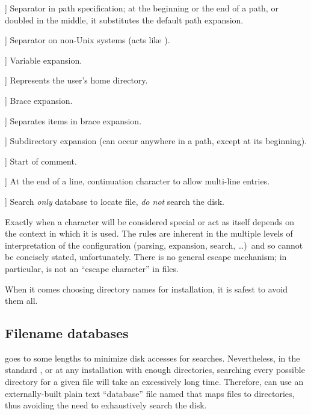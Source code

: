 \documentclass[12pt]{article}
\begin{document}
\newcommand{\CODE}[1]{\makebox[3em][l]{\code{#1}}}
\begin{ttdescription}
\item[\CODE{:}] Separator in path specification; at the beginning or
  the end of a path, or doubled in the middle, it substitutes the
  default path expansion.\par
\item[\CODE{;}] Separator on non-Unix systems (acts like \code{:}).
\item[\CODE{\$}] Variable expansion.
\item[\CODE{\string~}] Represents the user's home directory.
\item[\CODE{\char`\{...\char`\}}] Brace expansion.
\item[\CODE{,}] Separates items in brace expansion.
\item[\CODE{//}] Subdirectory expansion (can occur anywhere in
    a path, except at its beginning).
\item[\CODE{\%{\rm\ and }\#}] Start of comment.
\item[\CODE{\bs}] At the end of a line, continuation character to allow
    multi-line entries.
\item[\CODE{!!}] Search \emph{only} database to locate file, \emph{do
    not} search the disk.
\end{ttdescription}

Exactly when a character will be considered special or act as itself
depends on the context in which it is used. The rules are inherent in
the multiple levels of interpretation of the configuration (parsing,
expansion, search, \ldots)\ and so cannot be concisely stated,
unfortunately. There is no general escape mechanism; in particular,
\samp{\bs} is not an ``escape character'' in  files.

When it comes choosing directory names for installation, it is safest to
avoid them all.

\subsection{Filename databases}
\label{sec:filename-database}

\KPS{} goes to some lengths to minimize disk accesses for searches.
Nevertheless, in the standard \TL, or at any installation with enough
directories, searching every possible directory for a given file will
take an excessively long time. Therefore, \KPS{} can use an
externally-built plain text ``database'' file named  that
maps files to directories, thus avoiding the need to exhaustively search
the disk.
\end{document}
